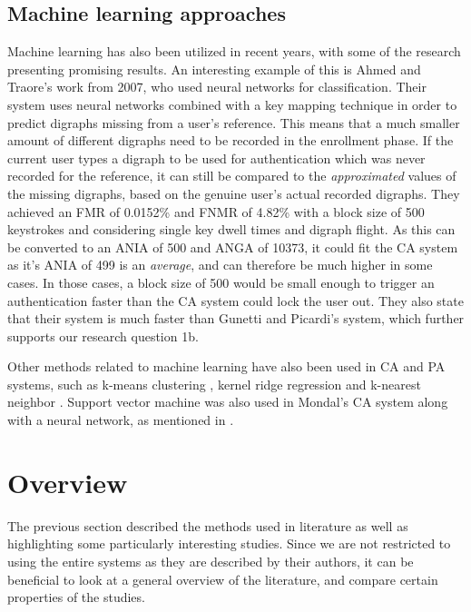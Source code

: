\documentclass[informationsecurity]{gucmasterproject}
\begin{document}
\subsection{Machine learning approaches}
Machine learning has also been utilized in recent years, with some of the research presenting promising results.
An interesting example of this is Ahmed and Traore's \cite{Ahmed} work from 2007, who used neural networks for classification.
Their system uses neural networks combined with a key mapping technique in order to predict digraphs missing from a user's reference.
This means that a much smaller amount of different digraphs need to be recorded in the enrollment phase.
If the current user types a digraph to be used for authentication which was never recorded for the reference, it can still be compared to the \textit{approximated} values of the missing digraphs, based on the genuine user's actual recorded digraphs.
They achieved an FMR of 0.0152\% and FNMR of 4.82\% with a block size of 500 keystrokes and considering single key dwell times and digraph flight.
As this can be converted to an ANIA of 500 and ANGA of 10373, it could fit the CA system as it's ANIA of 499 is an \textit{average}, and can therefore be much higher in some cases.
In those cases, a block size of 500 would be small enough to trigger an authentication faster than the CA system could lock the user out.
They also state that their system is much faster than Gunetti and Picardi's system, which further supports our research question 1b.

Other methods related to machine learning have also been used in CA and PA systems, such as k-means clustering \cite{KIM2017, Solami}, kernel ridge regression \cite{900words} and k-nearest neighbor \cite{hu, monaco}.
Support vector machine was also used in Mondal's \cite{mondal} CA system along with a neural network, as mentioned in .



\section{Overview}
\label{sec:related-overview}
The previous section described the methods used in literature as well as highlighting some particularly interesting studies.
Since we are not restricted to using the entire systems as they are described by their authors, it can be beneficial to look at a general overview of the literature, and compare certain properties of the studies.
\end{document}
